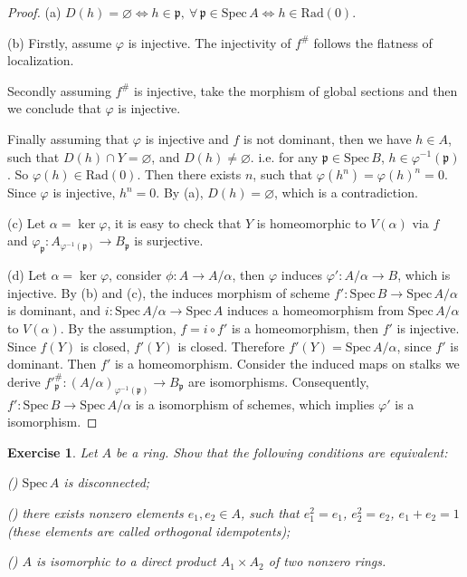 \documentclass{amsart}
\newtheorem{exe}{Exercise}[subsection]
\begin{document}
\begin{proof}
(a) $D(h)=\varnothing\iff h\in \mathfrak{p},\ \forall\, \mathfrak{p}\in \mathrm{Spec}\,A\iff h\in \mathrm{Rad}(0)$. 

(b) Firstly, assume $\varphi$ is injective. The injectivity of $f^\#$ follows the flatness of localization.

Secondly assuming $f^\#$ is injective, take the morphism of global sections and then we conclude that $\varphi$ is injective.

Finally assuming that $\varphi$ is injective and $f$ is not dominant, then we have $h\in A$, such that $D(h)\cap Y=\varnothing$, and $D(h)\neq\varnothing$. i.e. for any $\mathfrak{p}\in \mathrm{Spec}\,B$, $h\in\varphi^{-1}(\mathfrak{p})$.
So $\varphi(h)\in \mathrm{Rad}(0)$. Then there exists $n$, such that $\varphi(h^n)=\varphi(h)^n=0$. Since $\varphi$
is injective, $h^n=0$. By (a), $D(h)=\varnothing$, which is a contradiction.

(c) Let $\alpha=\ker\varphi$, it is easy to check that $Y$ is homeomorphic to $V(\alpha)$ via $f$ and
$\varphi_\mathfrak{p}: A_{\varphi^{-1}(\mathfrak{p})}\longrightarrow B_\mathfrak{p}$ is surjective.

(d) Let $\alpha=\ker\varphi$, consider $\phi:A\rightarrow A/\alpha$, then $\varphi$ induces $\varphi':A/\alpha \rightarrow B $,
which is injective. By (b) and (c), the induces morphism of scheme $f':\mathrm{Spec}\,B\rightarrow \mathrm{Spec}\,A/\alpha$ is dominant, and
$i:\mathrm{Spec}\,A/\alpha\rightarrow \mathrm{Spec}\,A$ induces a homeomorphism from $\mathrm{Spec}\,A/\alpha$ to $V(\alpha)$. By the assumption, $f=i\circ f'$ is
a homeomorphism, then $f'$ is injective. Since $f(Y)$ is closed, $f'(Y)$ is closed. Therefore $f'(Y)=\mathrm{Spec}\,A/\alpha$, since $f'$ is dominant.
Then $f'$ is a homeomorphism. Consider the induced maps on stalks we derive $f'^\#_\mathfrak{p}:(A/\alpha)_{\varphi^{-1}(\mathfrak{p})}\rightarrow B_\mathfrak{p}$ are isomorphisms.
Consequently, $f': \mathrm{Spec}\,B \rightarrow \mathrm{Spec}\,A/\alpha$ is a isomorphism of schemes, which implies $\varphi'$ is a isomorphism.
\end{proof}

\begin{exe}
Let $A$ be a ring. Show that the following conditions are equivalent:

\textup{()} $\mathrm{Spec}\,A$ is disconnected;

\textup{()} there exists nonzero elements $ e_1,e_2\in A$, such that $e_1^2=e_1$, $e_2^2=e_2$, $e_1+e_2=1$ (these elements are called \emph{orthogonal idempotents});

\textup{()} $A$ is isomorphic to a direct product $A_1\times A_2$ of two nonzero rings.
\end{exe}
\end{document}
